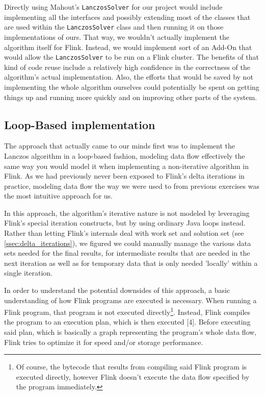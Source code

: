 
Directly using Mahout's \texttt{LanczosSolver} for our project would include implementing all
the interfaces and possibly extending most of the classes that are used within the
\texttt{LanczosSolver} class and then running it on those implementations of ours. That way, we
wouldn't actually implement the algorithm itself for Flink. Instead, we would implement sort of
an Add-On that would allow the \texttt{LanczosSolver} to be run on a Flink cluster. The benefits
of that kind of code reuse include a relatively high confidence in the correctness of the
algorithm's actual implementation. Also, the efforts that would be saved by not implementing the
whole algorithm ourselves could potentially be spent on getting things up and running more
quickly and on improving other parts of the system.



\subsection{Loop-Based implementation}

The approach that actually came to our minds first was to implement the Lanczos algorithm in a
loop-based fashion, modeling data flow effectively the same way you would model it when
implementing a non-iterative algorithm in Flink. As we had previously never been exposed to
Flink's delta iterations in practice, modeling data flow the way we were used to from previous
exercises was the most intuitive approach for us.

In this approach, the algorithm's iterative nature is not modeled by leveraging Flink's special
iteration constructs, but by using ordinary Java loops instead. Rather than letting Flink's
internals deal with work set and solution set (see \ref{ssec:delta_iterations}), we figured we
could manually manage the various data sets needed for the final results, for intermediate
results that are needed in the next iteration as well as for temporary data that is only needed
'locally' within a single iteration.


In order to understand the potential downsides of this approach, a basic understanding of how
Flink programs are executed is necessary. When running a Flink program, that program is not
executed directly\footnote{Of course, the bytecode that results from compiling said Flink
program is executed directly, however Flink doesn't execute the data flow specified by the
program immediately.}. Instead, Flink compiles the program to an execution plan, which is then
executed [4]. Before executing said plan, which is basically a graph representing the program's
whole data flow, Flink tries to optimize it for speed and/or storage performance.

